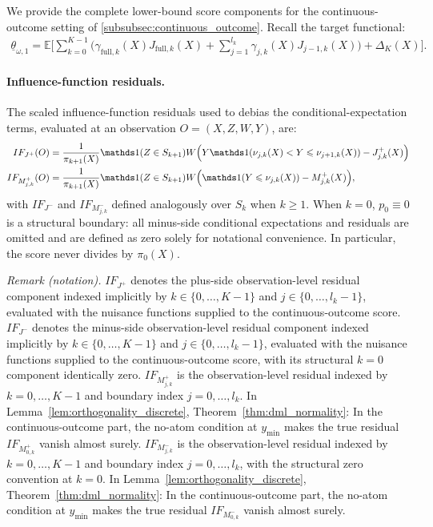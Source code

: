 We provide the complete lower-bound score components for the continuous-outcome setting of \cref{subsubsec:continuous_outcome}. Recall the target functional:
\begin{align*}
    \underline{\theta}_{\omega,1} = \mathbb{E}\Bigg[\sum_{k=0}^{K-1}\bigg(\gamma_{\text{full},k}(X) J_{\text{full},k}(X) + \sum_{j=1}^{l_k} \gamma_{j,k}(X) J_{j-1,k}(X)\bigg) + \Delta_K(X) \Bigg].
\end{align*}

\paragraph{Influence-function residuals.} The scaled influence-function residuals used to debias the conditional-expectation terms, evaluated at an observation $O = (X, Z, W, Y)$, are:
\begin{align*}
    IF_{J^+}(O) &= \frac{1}{\pi_{k+1}(X)} \indicator(Z \in S_{k+1}) W \Big( Y \indicator(\nu_{j,k}(X) < Y \leqslant \nu_{j+1,k}(X)) - J_{j,k}^+(X) \Big) \\
    IF_{M_{j,k}^+}(O) &= \frac{1}{\pi_{k+1}(X)} \indicator(Z \in S_{k+1}) W \Big( \indicator(Y \leqslant \nu_{j,k}(X)) - M_{j,k}^+(X) \Big),
\end{align*}
with $IF_{J^-}$ and $IF_{M_{j,k}^-}$ defined analogously over $S_k$ when $k\geqslant1$. When $k=0$, $p_0\equiv0$ is a structural boundary: all minus-side conditional expectations and residuals are omitted and are defined as zero solely for notational convenience. In particular, the score never divides by $\pi_0(X)$.

\noindent\textit{Remark (notation).} $IF_{J^+}$ denotes the plus-side observation-level residual component indexed implicitly by $k\in\{0,\ldots,K-1\}$ and $j\in\{0,\ldots,l_k-1\}$, evaluated with the nuisance functions supplied to the continuous-outcome score. $IF_{J^-}$ denotes the minus-side observation-level residual component indexed implicitly by $k\in\{0,\ldots,K-1\}$ and $j\in\{0,\ldots,l_k-1\}$, evaluated with the nuisance functions supplied to the continuous-outcome score, with its structural $k=0$ component identically zero. $IF_{M_{j,k}^+}$ is the observation-level residual indexed by $k=0,\ldots,K-1$ and boundary index $j=0,\ldots,l_k$. In Lemma~\ref{lem:orthogonality_discrete}, Theorem~\ref{thm:dml_normality}: In the continuous-outcome part, the no-atom condition at $y_{\min}$ makes the true residual $IF_{M_{0,k}^+}$ vanish almost surely. $IF_{M_{j,k}^-}$ is the observation-level residual indexed by $k=0,\ldots,K-1$ and boundary index $j=0,\ldots,l_k$, with the structural zero convention at $k=0$. In Lemma~\ref{lem:orthogonality_discrete}, Theorem~\ref{thm:dml_normality}: In the continuous-outcome part, the no-atom condition at $y_{\min}$ makes the true residual $IF_{M_{0,k}^-}$ vanish almost surely.


